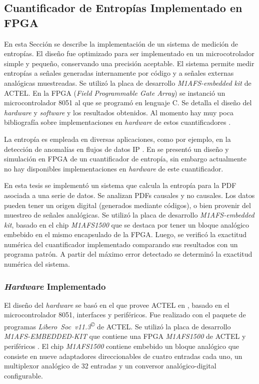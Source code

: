 \subsection{Cuantificador de Entropías Implementado en FPGA}
\label{ssecCuantiImpFPGA}

En esta Sección se describe la implementación de un sistema de medición de entropías.
El diseño fue optimizado para ser implementado en un microcotrolador simple y pequeño, conservando una precisión aceptable.
El sistema permite medir entropías a señales generadas internamente por código y a señales externas analógicas muestreadas.
Se utilizó la placa de desarrollo \textit{M1AFS-embedded kit} de ACTEL.
En la FPGA (\textit{Field Programmable Gate Array}) se instanció un microcontrolador 8051 al que se programó en lenguaje C.
Se detalla el diseño del \textit{hardware} y \textit{software} y los resultados obtenidos.
Al momento hay muy poca bibliograf\'ia sobre implementaciones en \textit{hardware} de estos cuantificadores \cite{DeMicco2013}.

La entropía es empleada en diversas aplicaciones, como por ejemplo, en la detección de anomalías en flujos de datos IP \cite{Gu2005,Wagner2006, actelM1AFS1500}.
En \cite{Subramanya2008} se presentó un diseño y simulación en FPGA de un cuantificador de entropía, sin embargo actualmente no hay disponibles implementaciones en \textit{hardware} de este cuantificador.

En esta tesis se implementó un sistema que calcula la entropía para la PDF asociada a una serie de datos.
Se analizan PDFs causales y no causales.
Los datos pueden tener un origen digital (generados mediante códigos), o bien provenir del muestreo de señales analógicas.
Se utilizó la placa de desarrollo \textit{M1AFS-embedded kit}, basado en el chip \textit{M1AFS1500} que se destaca por tener un bloque analógico embebido en el mismo encapsulado de la FPGA.
Luego, se verificó la exactitud numérica del cuantificador implementado comparando sus resultados con un programa patrón.
A partir del máximo error detectado se determinó la exactitud numérica del sistema.

\subsubsection{\textit{Hardware} Implementado}
\label{sec:Hardware}

El diseño del \textit{hardware} se basó en el que provee ACTEL en \cite{Core8051sH}, basado en el microcontrolador 8051, interfaces y periféricos.
Fue realizado con el paquete de programas \textit{Libero~Soc~v11.3\textsuperscript\copyright} de ACTEL.
Se utilizó la placa de desarrollo \textit{M1AFS-EMBEDDED-KIT} que contiene una FPGA \textit{M1AFS1500} de ACTEL y periféricos \cite{actelM1AFS1500}.
El chip \textit{M1AFS1500} contiene embebido un bloque analógico que consiste en nueve adaptadores direccionables de cuatro entradas cada uno, un multiplexor analógico de 32 entradas y un conversor analógico-digital configurable.

